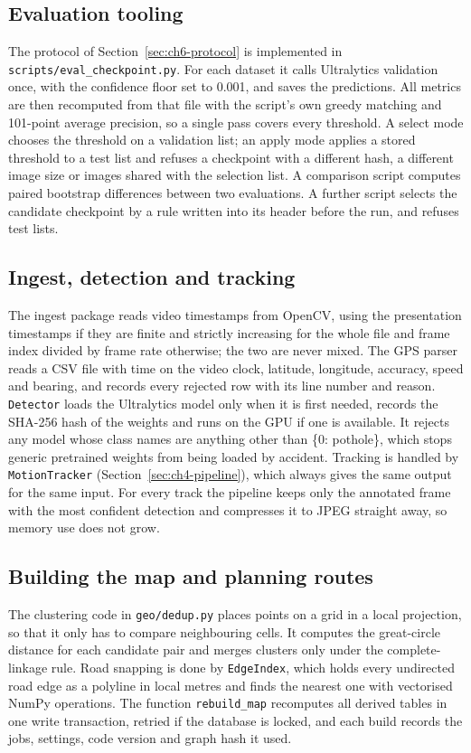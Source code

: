 \subsection{Evaluation tooling}\label{sec:ch5-eval}
The protocol of Section~\ref{sec:ch6-protocol} is implemented in \texttt{scripts/eval\_checkpoint.py}. For each dataset it calls Ultralytics validation once, with the confidence floor set to 0.001, and saves the predictions. All metrics are then recomputed from that file with the script's own greedy matching and 101-point average precision, so a single pass covers every threshold. A select mode chooses the threshold on a validation list; an apply mode applies a stored threshold to a test list and refuses a checkpoint with a different hash, a different image size or images shared with the selection list. A comparison script computes paired bootstrap differences between two evaluations. A further script selects the candidate checkpoint by a rule written into its header before the run, and refuses test lists.

\subsection{Ingest, detection and tracking}
The ingest package reads video timestamps from OpenCV, using the presentation timestamps if they are finite and strictly increasing for the whole file and frame index divided by frame rate otherwise; the two are never mixed. The GPS parser reads a CSV file with time on the video clock, latitude, longitude, accuracy, speed and bearing, and records every rejected row with its line number and reason. \texttt{Detector} loads the Ultralytics model only when it is first needed, records the SHA-256 hash of the weights and runs on the GPU if one is available. It rejects any model whose class names are anything other than \{0: pothole\}, which stops generic pretrained weights from being loaded by accident. Tracking is handled by \texttt{MotionTracker} (Section~\ref{sec:ch4-pipeline}), which always gives the same output for the same input. For every track the pipeline keeps only the annotated frame with the most confident detection and compresses it to JPEG straight away, so memory use does not grow.

\subsection{Building the map and planning routes}
The clustering code in \texttt{geo/dedup.py} places points on a grid in a local projection, so that it only has to compare neighbouring cells. It computes the great-circle distance for each candidate pair and merges clusters only under the complete-linkage rule. Road snapping is done by \texttt{EdgeIndex}, which holds every undirected road edge as a polyline in local metres and finds the nearest one with vectorised NumPy operations. The function \texttt{rebuild\_map} recomputes all derived tables in one write transaction, retried if the database is locked, and each build records the jobs, settings, code version and graph hash it used.

